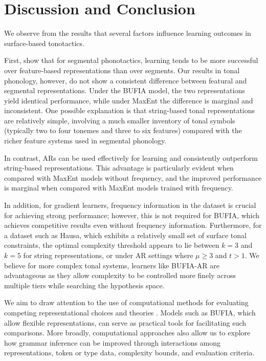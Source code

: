 \documentclass[11pt]{article}
\begin{document}
\section{Discussion and Conclusion}
We observe from the results that several factors influence learning
outcomes in surface-based tonotactics.

First, \citet{wilson2018accidental} show that for segmental
phonotactics, learning tends to be more successful over
feature-based representations than over segments. Our results
in tonal phonology, however, do not show a consistent difference
between featural and segmental representations. Under the BUFIA
model, the two representations yield identical performance,
while under MaxEnt the difference is marginal and inconsistent.
One possible explanation is that string-based tonal representations
are relatively simple, involving a much smaller inventory of tonal
symbols (typically two to four tonemes and three to six
features) compared with the richer feature systems used in
segmental phonology.

In contrast, ARs can be used effectively for learning and
consistently outperform string-based representations.
This advantage is particularly evident when compared with
MaxEnt models without frequency, and the improved performance is
marginal when compared with MaxEnt models trained with frequency.

In addition, for gradient learners, frequency information in the
dataset is crucial for achieving strong performance; however,
this is not required for BUFIA, which achieves competitive
results even without frequency information. Furthermore, for
a dataset such as Hausa, which exhibits a relatively small
set of surface tonal constraints, the optimal complexity
threshold appears to lie between $k=3$ and $k=5$ for string
representations, or under AR settings where $\mu \geq 3$
and $t > 1$. We believe for more complex tonal systems, learners
like BUFIA-AR are advantageous as they allow complexity to be
controlled more finely across multiple tiers while searching the
hypothesis space.

We aim to draw attention to the use of computational methods
for evaluating competing representational choices and theories
\citep{oakdenNotationalEquivalenceTonal2020,danis2025logical}.
Models such as BUFIA, which allow flexible representations,
can serve as practical tools for facilitating such comparisons.
More broadly, computational approaches also allow us to explore
how grammar inference can be improved through interactions
among representations, token or type data, complexity bounds,
and evaluation criteria.
\end{document}
